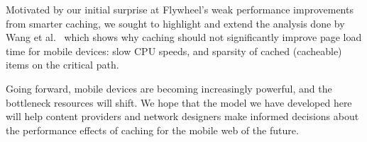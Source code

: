 
Motivated by our initial surprise at Flywheel's weak performance improvements
from smarter caching, we sought to highlight and extend the analysis done by
Wang et al.~\cite{wang2013demystifying} which shows why caching should not
significantly improve page load time for mobile devices: slow CPU
speeds, and sparsity of cached (cacheable) items on the critical
path.


Going forward, mobile devices are becoming increasingly powerful, and the
bottleneck resources will shift. We hope that the model we have developed here
will help content providers and network designers make informed decisions about the performance
effects of caching for the mobile web of the future.



